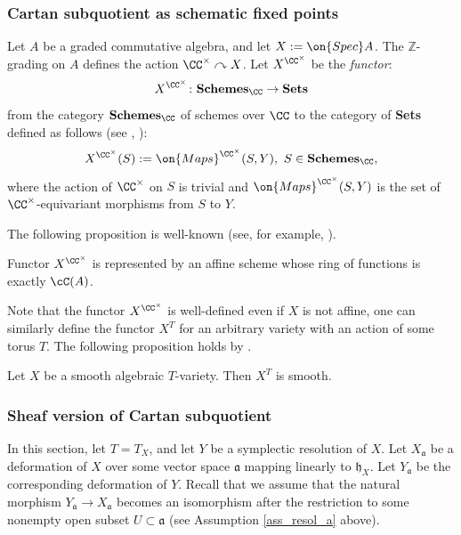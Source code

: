 \documentclass[12pt]{amsart}
\begin{document}
\subsubsection{Cartan subquotient as schematic fixed points}\label{sec_schem_fixed}
Let $A$ be a graded commutative algebra, and let $X:=\on{Spec}A$. The $\mathbb{Z}$-grading on $A$ defines the action $\CC^\times \curvearrowright X$. Let $X^{\CC^\times}$ be the {\emph{functor}}:
\begin{equation*}
X^{\CC^\times}\colon {\bf{Schemes}}_{\CC} \rightarrow {\bf{Sets}}
\end{equation*}
from the category ${\bf{Schemes}}_{\CC}$ of schemes over $\CC$ to the category of {\bf{Sets}} defined as follows (see \cite{fogarty}, \cite[Section 1.2]{drinfeld}):
\begin{equation*}
X^{\CC^\times}(S):=\on{Maps}^{\CC^\times}(S,Y),~S \in {\bf{Schemes}}_{\CC},
\end{equation*}
where the action of $\CC^\times$ on $S$ is trivial and $\on{Maps}^{\CC^\times}(S,Y)$ is the set of $\CC^\times$-equivariant morphisms from $S$ to $Y$.

The following proposition is well-known (see, for example, \cite[Proposition 1.4]{ksh}).

\begin{prop}
Functor $X^{\CC^\times}$ is represented by an affine scheme whose ring of functions is exactly $\cC(A)$.  
\end{prop}

Note that the functor $X^{\CC^\times}$ is well-defined even if $X$ is not affine, one can similarly define the functor $X^{T}$ for an arbitrary variety with an action of some torus $T$. The following proposition holds by \cite{iversen}.

\begin{prop}\label{prop_fixed_smooth}
Let $X$ be a smooth algebraic $T$-variety. Then  $X^{T}$ is smooth.
\end{prop}






\subsubsection{Sheaf version of Cartan subquotient}
In this section, let $T=T_X$, and let $Y$ be a symplectic resolution of $X$. Let $X_{\mathfrak{a}}$ be a deformation of $X$ over some vector space $\mathfrak{a}$ mapping linearly to $\mathfrak{h}_X$. Let $Y_{\mathfrak{a}}$ be the corresponding deformation of $Y$. Recall that we assume that the natural morphism $Y_{\mathfrak{a}} \rightarrow X_{\mathfrak{a}}$ becomes an isomorphism after the restriction to some nonempty open subset $U \subset \mathfrak{a}$ (see Assumption \ref{ass_resol_a} above). 
\end{document}
